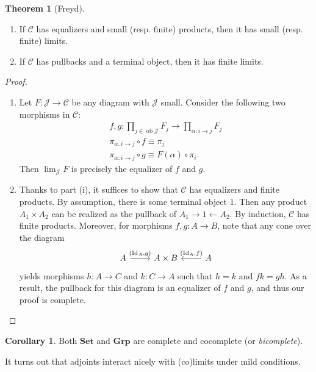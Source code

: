 \documentclass[10pt,letterpaper,cm]{nupset}
\theoremstyle{definition}
\theoremstyle{theorem}
\newtheorem{theorem}[definition]{Theorem}
\newtheorem{corollary}[definition]{Corollary}
\theoremstyle{remark}
\newcommand{\1}{\mathbf{1}}
\renewcommand{\c}{\mathscr{C}}
\renewcommand{\j}{\mathscr{J}}
\newcommand{\0}{\vec 0}
\DeclareMathOperator{\id}{Id}
\DeclareMathOperator{\ob}{ob}
\begin{document}
\begin{theorem}[Freyd] $ $
\begin{enumerate}[label=(\roman*)]
\item If $\c$ has equalizers and small (resp. finite) products, then it has small (resp. finite) limits.
\item If $\c$ has pullbacks and a terminal object, then it has finite limits.
\end{enumerate}
\end{theorem}
\begin{proof} $ $
\begin{enumerate}
\item Let $F : \j \to \c$ be any diagram with $\j$ small. Consider the following two morphisms in $\c$:
\begin{gather*}
f, g: \prod_{j\in \ob{\j}}F_j \to \prod_{\alpha : i \to j}F_j
\\ \pi_{\alpha : i \to j} \circ f \equiv \pi_j
\\ \pi_{\alpha : i \to j} \circ g \equiv F(\alpha) \circ \pi_i.
\end{gather*}
Then $\lim_{\j}{F}$ is precisely the equalizer of $f$ and $g$.
\item Thanks to part (i), it suffices to show that $\c$ has equalizers and finite products. By assumption, there is some terminal object $1$. Then any product $A_1 \times A_2$ can be realized as the pullback of $A_1 \rightarrow 1 \leftarrow A_2$. By induction, $\c$ has finite products. Moreover, for morphisms $f,g : A \to B$, note that any cone over the diagram 
\[
\begin{tikzcd}
A \arrow[r, "{\left(\id_A, g\right)}"] & A\times B & A \arrow[l, "{\left(\id_A, f\right)}"']
\end{tikzcd}
\] yields morphisms $h: A \to C$ and $k : C \to A$ such that $h=k$ and $fk = gh$. As a result, the pullback for this diagram is an equalizer of $f$ and $g$, and thus our proof is complete.
\end{enumerate}
\end{proof}

\begin{corollary}
Both $\mathbf{Set}$ and $\mathbf{Grp}$ are complete and cocomplete (or \textit{bicomplete}).
\end{corollary}

\medskip

It turns out that adjoints interact nicely with (co)limits under mild conditions.
\end{document}
